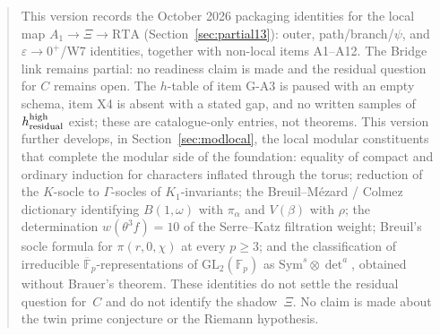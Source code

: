 \begin{abstract}
This version records the October 2026 packaging identities for the local map $A_1\to\Xi\to\mathrm{RTA}$ (Section~\ref{sec:partial13}): outer, path/branch/$\psi$, and $\varepsilon\to0^+$/W7 identities, together with non-local items A1--A12. The Bridge link remains partial: no readiness claim is made and the residual question for $C$ remains open. The $h$-table of item G-A3 is paused with an empty schema, item X4 is absent with a stated gap, and no written samples of $h_{\rm residual}^{\rm high}$ exist; these are catalogue-only entries, not theorems.
This version further develops, in Section~\ref{sec:modlocal}, the local modular constituents that complete the modular side of the foundation: equality of compact and ordinary induction for characters inflated through the torus; reduction of the $K$-socle to $\Gamma$-socles of $K_1$-invariants; the Breuil--M\'ezard / Colmez dictionary identifying $B(1,\omega)$ with $\pi_\alpha$ and $V(\beta)$ with $\rho$; the determination $w(\theta^3 f)=10$ of the Serre--Katz filtration weight; Breuil's socle formula for $\pi(r,0,\chi)$ at every $p\ge3$; and the classification of irreducible $\overline{\mathbb{F}}_p$-representations of $\mathrm{GL}_2(\mathbb{F}_p)$ as $\mathrm{Sym}^s\otimes\det^a$, obtained without Brauer's theorem. These identities do not settle the residual question for~$C$ and do not identify the shadow~$\Xi$. No claim is made about the twin prime conjecture or the Riemann hypothesis.
\end{abstract}
\tableofcontents
\clearpage

